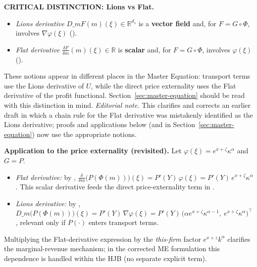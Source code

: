 ﻿\documentclass[11pt,letterpaper,oneside]{article}
\numberwithin{equation}{section}
\newcommand{\R}{\mathbb{R}}
\newcommand{\1}{\mathbf{1}}
\newcommand{\Dm}{D\_m}
\begin{document}
\begin{tcolorbox}[mathstyle]
\textbf{CRITICAL DISTINCTION: Lions vs Flat.}
\begin{itemize}[leftmargin=1.15em,itemsep=0.25em]
  \item \emph{Lions derivative} $\Dm F(m)(\xi)\in\R^{d_s}$ is a \textbf{vector field} and, for $F=G\circ\Phi$, involves $\nabla\varphi(\xi)$ ().
  \item \emph{Flat derivative} $\tfrac{\delta F}{\delta m}(m)(\xi)\in\R$ is \textbf{scalar} and, for $F=G\circ\Phi$, involves $\varphi(\xi)$ ().
\end{itemize}
These notions appear in different places in the Master Equation: transport terms use the Lions derivative of $U$, while the direct price externality uses the Flat derivative of the profit functional. Section~\ref{sec:master-equation} should be read with this distinction in mind.\newline
\emph{Editorial note.} This clarifies and corrects an earlier draft in which a chain rule for the Flat derivative was mistakenly identified as the Lions derivative; proofs and applications below (and in Section~\ref{sec:master-equation}) now use the appropriate notions.
\end{tcolorbox}

\begin{tcolorbox}[mathstyle]
\textbf{Application to the price externality (revisited).} Let $\varphi(\xi)=e^{x+\zeta}\kappa^\alpha$ and $G=P$.
\begin{itemize}[leftmargin=1.15em,itemsep=0.25em]
  \item \emph{Flat derivative:} by , $\tfrac{\delta}{\delta m}\big(P(\Phi(m))\big)(\xi)=P'(Y)\,\varphi(\xi)=P'(Y)\,e^{x+\zeta}\kappa^\alpha$. This scalar derivative feeds the direct price-externality term in .
  \item \emph{Lions derivative:} by , $\Dm\big(P(\Phi(m))\big)(\xi)=P'(Y)\,\nabla\varphi(\xi)=P'(Y)\,\big(\alpha e^{x+\zeta}\kappa^{\alpha-1},\ e^{x+\zeta}\kappa^\alpha\big)^{\!\top}$, relevant only if $P(\cdot)$ enters transport terms.
\end{itemize}
Multiplying the Flat-derivative expression by the \emph{this-firm} factor $e^{x+z}k^\alpha$ clarifies the marginal-revenue mechanism; in the corrected ME formulation this dependence is handled within the HJB (no separate explicit term).
\end{tcolorbox}
\end{document}
